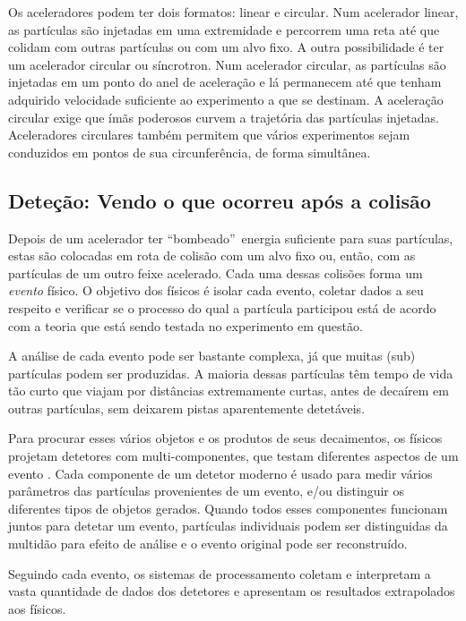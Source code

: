 Os aceleradores podem ter dois formatos: linear e
circular. Num acelerador linear, as partículas são
injetadas em uma extremidade e percorrem uma reta até que colidam com outras
partículas ou com um alvo fixo. A outra possibilidade é ter um acelerador
circular ou
síncrotron. Num acelerador circular, as partículas são injetadas em um ponto
do anel de aceleração e lá permanecem até que tenham adquirido velocidade
suficiente ao experimento a que se destinam. A aceleração circular exige que
ímãs poderosos curvem a trajetória das partículas injetadas. Aceleradores
circulares também permitem que vários experimentos sejam conduzidos em pontos
de sua circunferência, de forma simultânea.

\subsection{Deteção: Vendo o que ocorreu a\-pós a coli\-são}

Depois de um acelerador ter ``bombeado''\ energia suficiente para suas
par\-tí\-culas, estas são colocadas em rota de colisão com um alvo fixo ou,
então, com as partículas de um outro feixe acelerado. Cada uma dessas colisões
forma um \emph{evento} físico. O objetivo dos físicos é isolar cada evento,
coletar dados a seu respeito e verificar se o processo do qual a partícula
participou está de acordo com a teoria que está sendo testada no experimento
em questão.

A análise de cada evento pode ser bastante complexa, já que muitas (sub)
par\-tí\-cu\-las podem ser produzidas. A maioria dessas partículas têm tempo
de vida tão curto que viajam por distâncias extremamente curtas, antes de
decaírem em outras partículas, sem deixarem pistas aparentemente detetáveis.

Para procurar esses vários objetos e os produtos de seus decaimentos, os
físicos projetam detetores com multi-componentes, que testam diferentes
aspectos de um evento \cite{d0, cms, atlas-tp, booth}. Cada componente de um
detetor moderno é usado para medir vários parâmetros das partículas
provenientes de um evento, e/ou distinguir os diferentes tipos de objetos
gerados.  Quando todos esses componentes funcionam juntos para detetar um
evento, partículas individuais podem ser distinguidas da multidão para efeito
de análise e o evento original pode ser reconstruído.

Seguindo cada evento, os sistemas de processamento coletam e interpretam a
vasta quantidade de dados dos detetores e apresentam os resultados extrapolados
aos físicos.

